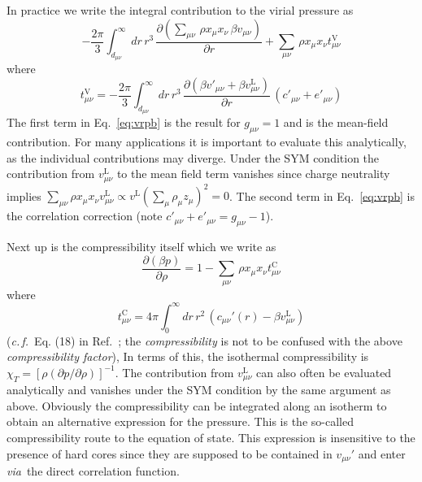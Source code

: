 \documentclass[12pt,a4paper]{article}
\newcommand{\latin}[1]{\emph{#1}}
\newcommand{\cf}{\latin{c.\,f.}}
\newcommand{\via}{\latin{via}}
\newcommand{\lr}{^{\mathrm{L}}}
\newcommand{\Eqref}[1]{Eq.~\eqref{#1}}
\newcommand{\Refcite}[1]{Ref.~\cite{#1}}
\begin{document}
In practice we write the integral contribution to the virial pressure as
%
\begin{equation}
-\frac{2\pi}{3}\int_{d_{\mu\nu}}^\infty\!\!dr\,r^3\,
\frac{\partial({\textstyle \sum_{\mu\nu}}\,
\rho x_\mu x_\nu\,\beta
  v_{\mu\nu})}{\partial r}
+{\textstyle \sum_{\mu\nu}}\,
\rho x_\mu x_\nu t^{\mathrm{V}}_{\mu\nu}
\label{eq:vrpb}
\end{equation}
%
where 
%
\begin{equation}
t^{\mathrm{V}}_{\mu\nu}=-\frac{2\pi}{3}\int_{d_{\mu\nu}}^\infty\!\!dr\,r^3\,
\frac{\partial(\beta v'_{\mu\nu}+\beta v_{\mu\nu}\lr)}{\partial r} 
\,(c'_{\mu\nu}+e'_{\mu\nu})
\end{equation}
%
The first term in \Eqref{eq:vrpb} is the result for $g_{\mu\nu}=1$ and
is the mean-field contribution.  For many applications it is important
to evaluate this analytically, as the individual contributions may
diverge.  Under the SYM condition the contribution from
$v_{\mu\nu}\lr$ to the mean field term vanishes since charge
neutrality implies $\sum_{\mu\nu}\rho x_\mu x_\nu v_{\mu\nu}\lr
\propto v\lr(\sum_\mu \rho_\mu z_\mu)^2 = 0$.  The second term in
\Eqref{eq:vrpb} is the correlation correction (note
$c'_{\mu\nu}+e'_{\mu\nu}=g_{\mu\nu}-1$).

Next up is the compressibility itself which we write as
%
\begin{equation}
\frac{\partial(\beta p)}{\partial\rho}=
1-{\textstyle \sum_{\mu\nu}}\,\rho x_\mu x_\nu t^{\mathrm{C}}_{\mu\nu}
\end{equation}
%
where
%
\begin{equation}
t^{\mathrm{C}}_{\mu\nu}={4\pi}\int_0^\infty\!\!dr\,r^2\,(c_{\mu\nu}'(r)
-\beta v_{\mu\nu}\lr)
\end{equation}
%
(\cf\ Eq. (18) in \Refcite{Vrbka09}; the \emph{compressibility} is
not to be confused with the above \emph{compressibility factor}), In
terms of this, the isothermal compressibility is
$\chi_T=[\rho(\partial p/\partial\rho)]^{-1}$.  The contribution from
$v_{\mu\nu}\lr$ can also often be evaluated analytically and vanishes
under the SYM condition by the same argument as above.  Obviously the
compressibility can be integrated along an isotherm to obtain an
alternative expression for the pressure.  This is the so-called
compressibility route to the equation of state.  This expression is
insensitive to the presence of hard cores since they are supposed to
be contained in $v_{\mu\nu}'$ and enter \via\ the direct correlation
function. 
\end{document}
